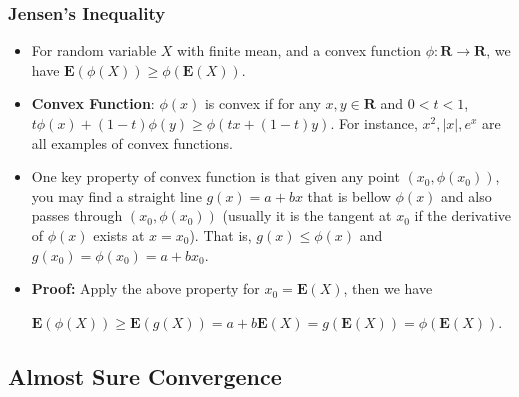 \documentclass[handout]{beamer}
\newcommand{\BE}{\mathbf{E}}
\begin{document}
\frame
{
  \frametitle{Jensen's Inequality}

   \begin{itemize}
       \item<1->[]
   \begin{Theorem} For random variable $X$ with finite mean, and a convex function $\phi: \mathbf{R}\rightarrow \mathbf{R}$,  we have $\BE(\phi(X)) \geq  \phi(\BE (X)) $. 
   \end{Theorem}

\item<2-> \textbf{Convex Function}:  $\phi(x)$ is convex if for any $x, y\in \mathbf{R}$ and $0<t<1$,  $t\phi(x)+(1-t) \phi(y) \geq \phi(tx+(1-t)y)$. For instance, $x^2, |x|, e^x$ are all examples of convex functions. 

\item<3-> One key property of convex function is that given any point $(x_0, \phi(x_0))$, you may find a straight line $g(x)=a+bx$ that is bellow $\phi(x)$ and also passes through $(x_0, \phi(x_0))$ (usually it is the tangent at $x_0$ if the derivative of $\phi(x)$ exists at $x=x_0$). That is, $g(x)\leq \phi(x)$ and $g(x_0)=\phi(x_0)=a+bx_0$.  


\item<4->  \textbf{Proof:} Apply the above property for $x_0=\BE(X)$, then we have 

$\BE(\phi(X))\geq \BE(g(X))=a+b \BE(X)=g(\BE(X))=\phi (\BE(X))$.
         
\end{itemize}
}

\subsection{Almost Sure Convergence}
\end{document}
